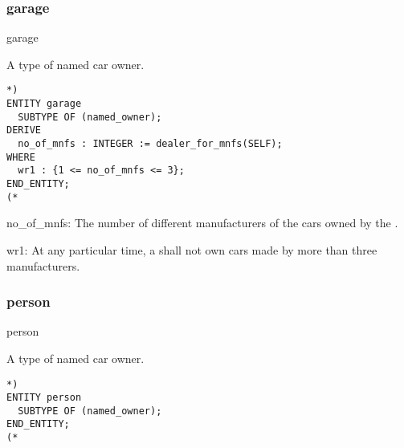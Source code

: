 \documentclass{article}
\begin{document}
\subsubsection{garage}

\begin{Mnamedesc}{garage}
\begin{Mdesctext}
    A type of named car owner.
\end{Mdesctext}

\begin{Mexp}
\begin{verbatim}
*)
ENTITY garage
  SUBTYPE OF (named_owner);
DERIVE
  no_of_mnfs : INTEGER := dealer_for_mnfs(SELF);
WHERE
  wr1 : {1 <= no_of_mnfs <= 3};
END_ENTITY;
(*
\end{verbatim}
\end{Mexp}

\begin{Matts}

\item[no\_of\_mnfs:] The number of different manufacturers of the cars owned by
the .
\end{Matts}

\begin{Mprops}

\item[wr1:] At any particular time, a  shall not own cars made by
more than three manufacturers.
\end{Mprops}
\end{Mnamedesc}

\subsubsection{person}


\begin{Mnamedesc}{person}
\begin{Mdesctext}
    A type of named car owner.
\end{Mdesctext}

\begin{Mexp}
\begin{verbatim}
*)
ENTITY person
  SUBTYPE OF (named_owner);
END_ENTITY;
(*
\end{verbatim}
\end{Mexp}
\end{Mnamedesc}
\end{document}
